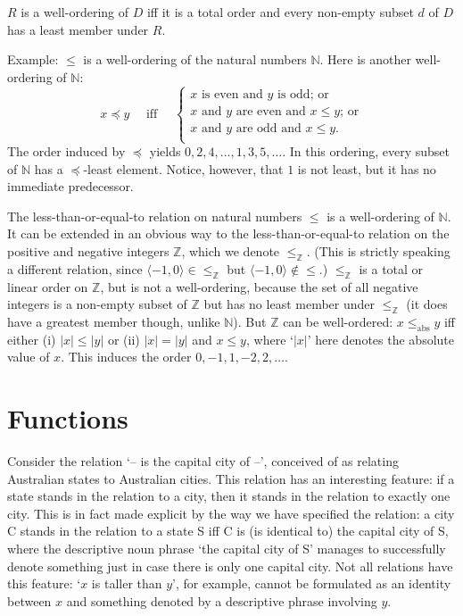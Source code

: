 \begin{definition}\label{def:wellord}
  $R$ is a well-ordering of $D$ iff it is a total order and every non-empty subset $d$ of $D$ has a least member under $R$.
\end{definition} Example: $\leqslant$ is a well-ordering of the natural numbers $\mathbb{N}$. Here is another well-ordering of $\mathbb{N}$: \begin{equation}
  x \preccurlyeq y \quad\text{ iff }\quad \begin{cases}
    \text{$x$ is even and $y$ is odd; or}\\
    \text{$x$ and $y$ are even and $x\leqslant y$; or}\\
    \text{$x$ and $y$ are odd and $x\leqslant y$}.\\
  \end{cases}
\end{equation} The order induced by $\preccurlyeq$ yields $0, 2, 4, \ldots, 1, 3, 5, \ldots$. In this ordering, every subset of $\mathbb{N}$ has a $\preccurlyeq$-least element. Notice, however, that $1$ is not least, but it has no immediate predecessor. 

The less-than-or-equal-to relation on natural numbers $\leqslant$ is a well-ordering of $\mathbb{N}$. It can be extended in an obvious way to the less-than-or-equal-to relation on the positive and negative integers $\mathbb{Z}$, which we denote $\leqslant_{\mathbb{Z}}$. (This is strictly speaking a different relation, since $\langle -1,0\rangle\in \leqslant_{\mathbb{Z}}$ but $\langle -1,0\rangle\notin \leqslant$.) $\leqslant_{\mathbb{Z}}$ is a total or linear order on $\mathbb{Z}$, but is not a well-ordering, because the set of all negative integers is a non-empty subset of $\mathbb{Z}$ but has no least member under $\leqslant_{\mathbb{Z}}$ (it does have a greatest member though, unlike $\mathbb{N}$). But $\mathbb{Z}$ can be well-ordered: $x \leqslant_{\text{abs}} y$ iff either (i) $|x|\leqslant |y|$ or (ii) $|x|=|y|$ and $x\leqslant y$, where `$|x|$' here denotes the absolute value of $x$.  This induces the order $0,-1,1,-2,2,\ldots$.

\section{Functions}

Consider the relation `– is the capital city of –', conceived of as relating  Australian states to Australian cities. This relation has an interesting feature: if a state stands in the relation to a city, then it stands in the relation to exactly one city. This is in fact made explicit by the way we have specified the relation: a city C stands in the relation to a state S iff C is (is identical to) the capital city of S, where the descriptive noun phrase `the capital city of S' manages to successfully denote something just in case there is only one capital city. Not all relations have this feature: `$x$ is taller than $y$', for example, cannot be formulated as an identity between $x$ and something denoted by a descriptive phrase involving $y$.

